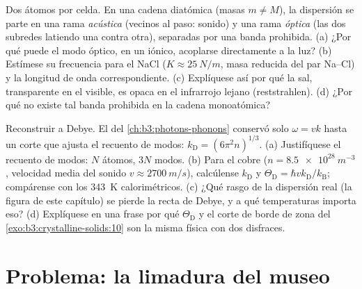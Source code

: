 \begin{exercise}[$\star\star\star$]\label{exo:b3:crystalline-solids:11}
Dos átomos por celda. En una cadena diatómica (masas $m \ne M$), la
dispersión se parte en una rama \emph{acústica} (vecinos al
paso: sonido) y una rama \emph{óptica} (las dos subredes
latiendo una contra otra), separadas por una banda prohibida. (a) ¿Por qué
puede el modo óptico, en un  iónico, acoplarse directamente a la
luz? (b) Estímese su frecuencia para el NaCl ($K \approx
\qty{25}{N/m}$, masa reducida del par Na--Cl) y la
longitud de onda correspondiente. (c) Explíquese así por qué la sal, transparente
en el visible, es opaca en el infrarrojo lejano (reststrahlen). (d)
¿Por qué no existe tal banda prohibida en la cadena monoatómica?
\end{exercise}

\begin{exercise}[$\star\star\star$]\label{exo:b3:crystalline-solids:12}
Reconstruir a Debye. El  del \cref{ch:b3:photons-phonons}
conservó solo $\omega = vk$ hasta un corte que ajusta el recuento de modos:
$k_{\text{D}} = (6\pi^2n)^{1/3}$. (a) Justifíquese el recuento de modos:
$N$ átomos, $3N$ modos. (b) Para el cobre ($n = \qty{8.5e28}{m^{-3}}$,
velocidad media del sonido $v \approx \qty{2700}{m/s}$), calcúlense
$k_{\text{D}}$ y $\Theta_{\text{D}} =
\hbar vk_{\text{D}}/k_{\text{B}}$; compárense con los
\qty{343}{K} calorimétricos. (c) ¿Qué rasgo de la dispersión real (la figura
de este capítulo) se pierde la recta de Debye, y a qué temperaturas
importa eso? (d) Explíquese en una frase por qué
$\Theta_{\text{D}}$ y el corte de borde de zona del
\cref{exo:b3:crystalline-solids:10} son la misma física con dos
disfraces.
\end{exercise}

\section{Problema: la limadura del museo}

